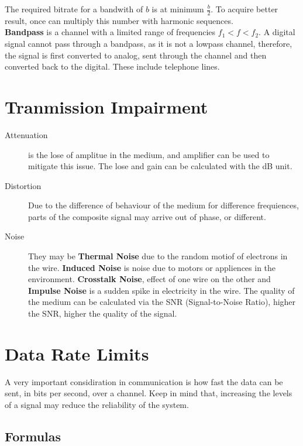 \documentclass[11pt,a4paper,twoside]{book}
\begin{document}
The required bitrate for a bandwith of $b$ is at minimum $\frac{b}{2}$. To acquire better result, once can multiply this number with harmonic sequences.\\

\textbf{Bandpass} is a channel with a limited range of frequencies $f_1 < f < f_2$. A digital signal cannot pass through a bandpass, as it is not a lowpass channel, therefore, the signal is first converted to analog, sent through the channel and then converted back to the digital. These include telephone lines.\\

\section{Tranmission Impairment}

\begin{description}
\item[Attenuation] is the lose of amplitue in the medium, and amplifier can be used to mitigate this issue. The lose and gain can be calculated with the dB unit.
\item[Distortion] Due to the difference of behaviour of the medium for difference frequiences, parts of the composite signal may arrive out of phase, or different.\\
\item[Noise] They may be \textbf{Thermal  Noise} due to the random motiof of electrons in the wire. \textbf{Induced Noise} is noise due to motors or appliences in the environment. \textbf{Crosstalk Noise}, effect of one wire on the other and \textbf{Impulse Noise} is a sudden spike in electricity in the wire. The quality of the medium can be calculated via the SNR (Signal-to-Noise Ratio), higher the SNR, higher the quality of the signal.
\end{description}

\section{Data Rate Limits}

A very important considiration in communication is how fast the data can be sent, in bits per second, over a channel. Keep in mind that, increasing the levels of a signal may reduce the reliability of the system.

\subsection{Formulas}
\end{document}
